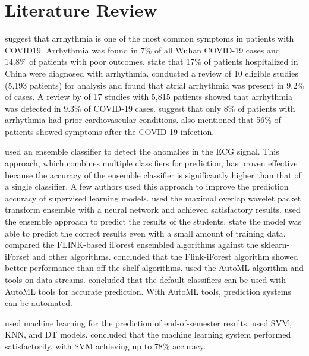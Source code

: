 \section{Literature Review} \label{sec:literature_review}

\cite*{02_rp} suggest that arrhythmia is one of the most common symptoms in patients with COVID19. {\responsemod Arrhythmia was found in 7\% of all Wuhan COVID-19 cases and 14.8\% of patients with poor outcomes.} \cite*{18_rp} state that 17\% of patients hospitalized in China were diagnosed with arrhythmia. \citeauthor{18_rp} conducted a review of 10 eligible studies (5,193 patients) for analysis and found that atrial arrhythmia was present in 9.2\% of cases. A review by \cite*{15_rp} of 17 studies with 5,815 patients showed that arrhythmia was detected in 9.3\% of COVID-19 cases. \cite*{25_rp} suggest that only 8\% of patients with arrhythmia had prior cardiovascular conditions. {\responsemod \citeauthor{25_rp} also mentioned that 56\% of patients showed symptoms after the COVID-19 infection.}

\cite*{24_rp} used an ensemble classifier to detect the anomalies in the ECG signal. This approach, which combines multiple classifiers for prediction, has proven effective because the accuracy of the ensemble classifier is significantly higher than that of a single classifier. A few authors used this approach to improve the prediction accuracy of supervised learning models. \cite*{10_rp} used the maximal overlap wavelet packet transform ensemble with a neural network and achieved satisfactory results. \cite*{20_rp} used the ensemble approach to predict the results of the students. \citeauthor{20_rp} state the model was able to predict the correct results even with a small amount of training data. \cite*{16_rp} compared the FLINK-based iForest ensembled algorithms against the sklearn-iForset and other algorithms. \citeauthor{16_rp} concluded that the Flink-iForest algorithm showed better performance than off-the-shelf algorithms. \cite*{11_rp} used the AutoML algorithm and tools on data streams. \citeauthor{11_rp} concluded that the default classifiers can be used with AutoML tools for accurate prediction. With AutoML tools, prediction systems can be automated.

\cite*{ref_paper_m1} used machine learning for the prediction of end-of-semester results. \cite*{ref_paper_m1} used SVM, KNN, and DT models. \cite*{ref_paper_m1} concluded that the machine learning system performed satisfactorily, with SVM achieving up to 78\% accuracy.

